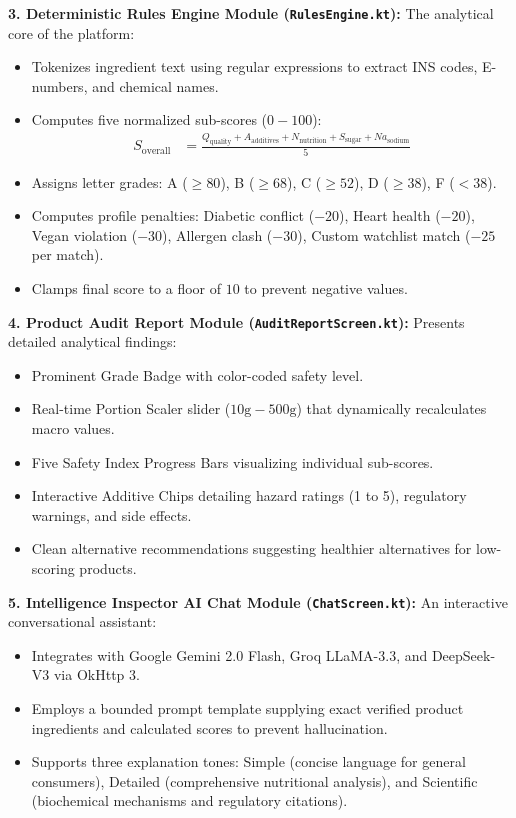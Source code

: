 \documentclass[12pt]{article}
\begin{document}
\vspace{0.3cm}

\noindent
\textbf{3. Deterministic Rules Engine Module (\texttt{RulesEngine.kt}):}
The analytical core of the platform:
\begin{itemize}
    \item Tokenizes ingredient text using regular expressions to extract INS codes, E-numbers, and chemical names.
    \item Computes five normalized sub-scores ($0-100$):
    \begin{align*}
        S_{\text{overall}} &= \frac{Q_{\text{quality}} + A_{\text{additives}} + N_{\text{nutrition}} + S_{\text{sugar}} + Na_{\text{sodium}}}{5}
    \end{align*}
    \item Assigns letter grades: A ($\ge 80$), B ($\ge 68$), C ($\ge 52$), D ($\ge 38$), F ($< 38$).
    \item Computes profile penalties: Diabetic conflict ($-20$), Heart health ($-20$), Vegan violation ($-30$), Allergen clash ($-30$), Custom watchlist match ($-25$ per match).
    \item Clamps final score to a floor of $10$ to prevent negative values.
\end{itemize}

\vspace{0.3cm}

\noindent
\textbf{4. Product Audit Report Module (\texttt{AuditReportScreen.kt}):}
Presents detailed analytical findings:
\begin{itemize}
    \item Prominent Grade Badge with color-coded safety level.
    \item Real-time Portion Scaler slider ($10\text{g} - 500\text{g}$) that dynamically recalculates macro values.
    \item Five Safety Index Progress Bars visualizing individual sub-scores.
    \item Interactive Additive Chips detailing hazard ratings (1 to 5), regulatory warnings, and side effects.
    \item Clean alternative recommendations suggesting healthier alternatives for low-scoring products.
\end{itemize}

\vspace{0.3cm}

\noindent
\textbf{5. Intelligence Inspector AI Chat Module (\texttt{ChatScreen.kt}):}
An interactive conversational assistant:
\begin{itemize}
    \item Integrates with Google Gemini 2.0 Flash, Groq LLaMA-3.3, and DeepSeek-V3 via OkHttp 3.
    \item Employs a bounded prompt template supplying exact verified product ingredients and calculated scores to prevent hallucination.
    \item Supports three explanation tones: Simple (concise language for general consumers), Detailed (comprehensive nutritional analysis), and Scientific (biochemical mechanisms and regulatory citations).
\end{itemize}
\end{document}
